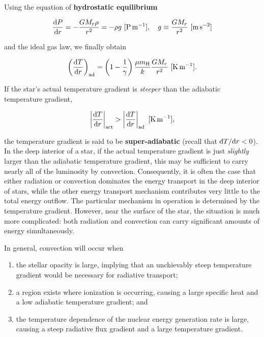 \documentclass[a4paper,10pt]{article}
\begin{document}
{\noindent}Using the equation of \textbf{hydrostatic equilibrium}

\begin{align*}
    \frac{{\rm d}P}{{\rm d}r} = -\frac{GM_r\rho}{r^2} = -\rho g ~ [{\rm P\,m^{-1}}], ~~~ g \equiv \frac{GM_r}{r^2} ~ [{\rm m\,s^{-2}}]
\end{align*}

{\noindent}and the ideal gas law, we finally obtain

\begin{align*}
    \left(\frac{{\rm d}T}{{\rm d}r}\right)_{\rm ad} = \left(1-\frac{1}{\gamma}\right) \frac{\mu m_{\rm H}}{k}\frac{GM_r}{r^2} ~ [{\rm K\,m^{-1}}].
\end{align*}

{\noindent}If the star's actual temperature gradient is \textit{steeper} than the adiabatic temperature gradient,

\begin{align*}
    \left\lvert\frac{{\rm d}T}{{\rm d}r}\right\rvert_{\rm act} > \left\lvert\frac{{\rm d}T}{{\rm d}r}\right\rvert_{\rm ad} ~ [{\rm K\,m^{-1}}],
\end{align*}

{\noindent}the temperature gradient is said to be \textbf{super-adiabatic} (recall that ${\rm d}T/{\rm d}r<0$). In the deep interior of a star, if the actual temperature gradient is just \textit{slightly} larger than the adiabatic temperature gradient, this may be sufficient to carry nearly all of the luminosity by convection. Consequently, it is often the case that either radiation or convection dominates the energy transport in the deep interior of stars, while the other energy transport mechanism contributes very little to the total energy outflow. The particular mechanism in operation is determined by the temperature gradient. However, near the surface of the star, the situation is much more complicated: both radiation and convection can carry significant amounts of energy simultaneously.

{\noindent}In general, convection will occur when

\begin{enumerate}
    \item the stellar opacity is large, implying that an unchievably steep temperature gradient would be necessary for radiative transport;
    \item a region exists where ionization is occurring, causing a large specific heat and a low adiabatic temperature gradient; and
    \item the temperature dependence of the nuclear energy generation rate is large, causing a steep radiative flux gradient and a large temperature gradient.
\end{enumerate}
\end{document}
